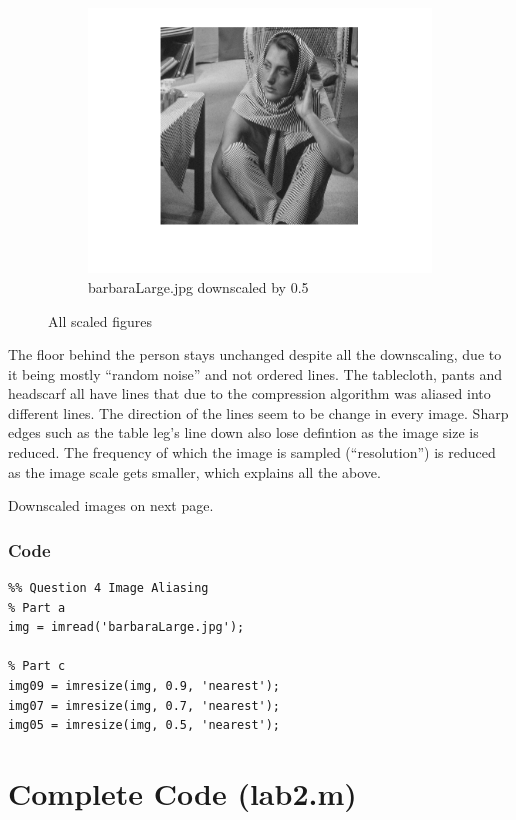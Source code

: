 \documentclass{article}
\begin{document}
\begin{figure}
    \begin{subfigure}[b]{0.4\linewidth}
        \centering
        \includegraphics[width=\linewidth]{barb05.png}
        \caption{barbaraLarge.jpg downscaled by 0.5}
    \end{subfigure}
    \caption{All scaled figures}
\end{figure}

The floor behind the person stays unchanged despite all the downscaling, due to it being mostly ``random noise'' and not ordered lines. The tablecloth, pants and headscarf all have lines that due to the compression algorithm was aliased into different lines. The direction of the lines seem to be change in every image. Sharp edges such as the table leg's line down also lose defintion as the image size is reduced. The frequency of which the image is sampled (``resolution'') is reduced as the image scale gets smaller, which explains all the above.


Downscaled images on next page.
\subsubsection{Code}
\begin{verbatim}
%% Question 4 Image Aliasing
% Part a
img = imread('barbaraLarge.jpg');

% Part c
img09 = imresize(img, 0.9, 'nearest');
img07 = imresize(img, 0.7, 'nearest');
img05 = imresize(img, 0.5, 'nearest');
\end{verbatim}
\pagebreak
\appendix
\section{Complete Code (lab2.m)}
\inputminted{Matlab}{lab2.m}
\end{document}
